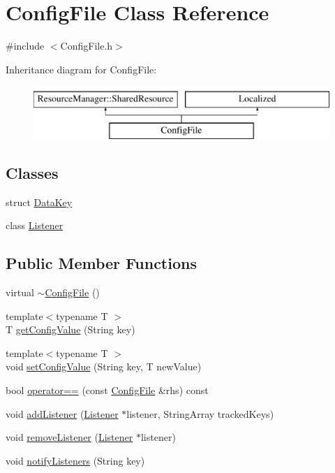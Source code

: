 \hypertarget{classConfigFile}{}\section{Config\+File Class Reference}
\label{classConfigFile}


{\ttfamily \#include $<$Config\+File.\+h$>$}

Inheritance diagram for Config\+File\+:\begin{figure}[H]
\begin{center}
\leavevmode
\includegraphics[height=2.000000cm]{classConfigFile}
\end{center}
\end{figure}
\subsection*{Classes}
\begin{DoxyCompactItemize}
\item 
struct \mbox{\hyperlink{structConfigFile_1_1DataKey}{Data\+Key}}
\item 
class \mbox{\hyperlink{classConfigFile_1_1Listener}{Listener}}
\end{DoxyCompactItemize}
\subsection*{Public Member Functions}
\begin{DoxyCompactItemize}
\item 
virtual \mbox{\hyperlink{classConfigFile_ae73765f7f0320bb6422da1cebe866f31}{$\sim$\+Config\+File}} ()
\item 
{\footnotesize template$<$typename T $>$ }\\T \mbox{\hyperlink{classConfigFile_adad78b3b99b0176b8f59310905fe6671}{get\+Config\+Value}} (String key)
\item 
{\footnotesize template$<$typename T $>$ }\\void \mbox{\hyperlink{classConfigFile_ae5fb973a2863f027b21fb17ebfdcd45c}{set\+Config\+Value}} (String key, T new\+Value)
\item 
bool \mbox{\hyperlink{classConfigFile_a1c903db747150a045d8b32fc3e8ee122}{operator==}} (const \mbox{\hyperlink{classConfigFile}{Config\+File}} \&rhs) const
\item 
void \mbox{\hyperlink{classConfigFile_a6bb53ad4195ac634155039149b01922d}{add\+Listener}} (\mbox{\hyperlink{classConfigFile_1_1Listener}{Listener}} $\ast$listener, String\+Array tracked\+Keys)
\item 
void \mbox{\hyperlink{classConfigFile_abe813ce8975feb1bca7e06ce961df167}{remove\+Listener}} (\mbox{\hyperlink{classConfigFile_1_1Listener}{Listener}} $\ast$listener)
\item 
void \mbox{\hyperlink{classConfigFile_aafbaeb574d209485c120a952d21588c6}{notify\+Listeners}} (String key)
\end{DoxyCompactItemize}
